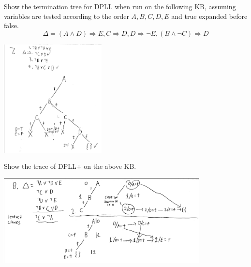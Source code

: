 \documentclass[11pt]{exam}
\begin{document}
\begin{questions}
\question[12] Show the termination tree for DPLL when run on the following KB, assuming variables are tested according to the order $A,B,C,D,E$ and true expanded before false.
$$\Delta = (A \land D) \Rightarrow E, C \Rightarrow D, D \Rightarrow \lnot E, (B \land \lnot C) \Rightarrow D$$

\begin{center}
\includegraphics[width=0.4\textwidth]{src/q7.png}
\end{center}

\newpage
\question[12] Show the trace of DPLL+ on the above KB.

\begin{center}
\includegraphics[width=0.8\textwidth]{src/q8.png}
\end{center}


\end{questions}
\end{document}
